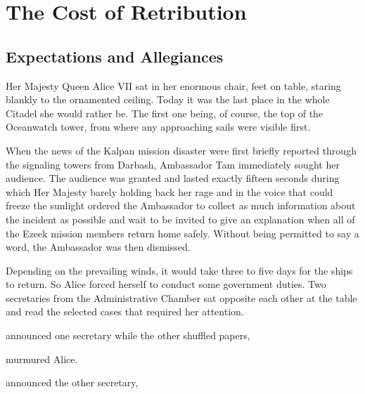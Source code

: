 \chapter{The Cost of Retribution}

\section{Expectations and Allegiances}

Her Majesty Queen Alice VII sat in her enormous chair, feet on table, staring blankly to the ornamented ceiling. Today it was the last place in the whole Citadel she would rather be. The first one being, of course, the top of the Oceanwatch tower, from where any approaching sails were visible first.

When the news of the Kalpan mission disaster were first briefly reported through the signaling towers from Darbash, Ambassador Tam immediately sought her audience. The audience was granted and lasted exactly fifteen seconds during which Her Majesty barely holding back her rage and in the voice that could freeze the sunlight ordered the Ambassador to collect as much information about the incident as possible and wait to be invited to give an explanation when all of the Ezeek mission members return home safely. Without being permitted to say a word, the Ambassador was then dismissed.

Depending on the prevailing winds, it would take three to five days for the ships to return. So Alice forced herself to conduct some government duties. Two secretaries from the Administrative Chamber sat opposite each other at the table and read the selected cases that required her attention.

 announced one secretary while the other shuffled papers, 

 murmured Alice.

 announced the other secretary, 


